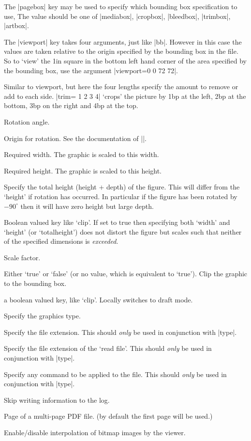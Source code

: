 \begin{description}
The |pagebox| key may be used to specify which bounding box specification to use,
The value should be one of
|mediabox|, |cropbox|, |bleedbox|, |trimbox|, |artbox|.
\item[viewport]
 The |viewport| key takes four arguments, just like
 |bb|. However in this case the values are taken relative to the
 origin specified by the bounding box in the file. So to `view' the
 1in square in the bottom left hand corner of the area specified by
 the bounding box, use the argument |viewport=0 0 72 72|.
\item[trim]
 Similar to viewport, but here the four lengths specify the
 amount to remove or add to each side. |trim= 1 2 3 4| `crops' the
 picture by 1bp at the left, 2bp at the bottom, 3bp on the right and
 4bp at the top.
\item[angle] Rotation angle.
\item[origin]
 Origin for rotation. See the documentation of |\rotatebox|.
\item[width] Required width. The
  graphic is scaled to this width.
\item[height] Required height. The
  graphic is scaled to this height.
\item[totalheight]
 Specify the total height (height $+$ depth) of the figure.
 This will differ from the `height' if rotation has occurred.
 In particular if the figure has been rotated by $-90^\circ$
 then it will have zero height but large depth.
\item[keepaspectratio]
 Boolean valued key like `clip'.
 If set to true then specifying both `width' and `height' (or
 `totalheight') does not distort the figure but scales such that
  neither of the specified dimensions is \emph{exceeded}.
\item[scale] Scale factor.
\item[clip] Either `true' or `false' (or no value, which is equivalent
  to `true'). Clip the graphic to the bounding box.
\item[draft] a boolean valued key, like `clip'. Locally switches to
  draft mode.
\item[type] Specify the graphics type.
\item[ext]  Specify the file extension. This should \emph{only} be
 used in conjunction with |type|.
\item[read] Specify the file extension of the `read file'. This
 should \emph{only} be used in conjunction with |type|.
\item[command] Specify any command to be applied to the file.  This
 should \emph{only} be used in conjunction with |type|.
\item[quiet]
 Skip writing information to the log.
\item[page]
Page of a multi-page PDF file. (by default the first page will be used.)
\item[interpolate]
Enable/disable interpolation of bitmap images by the viewer.
\end{description}

